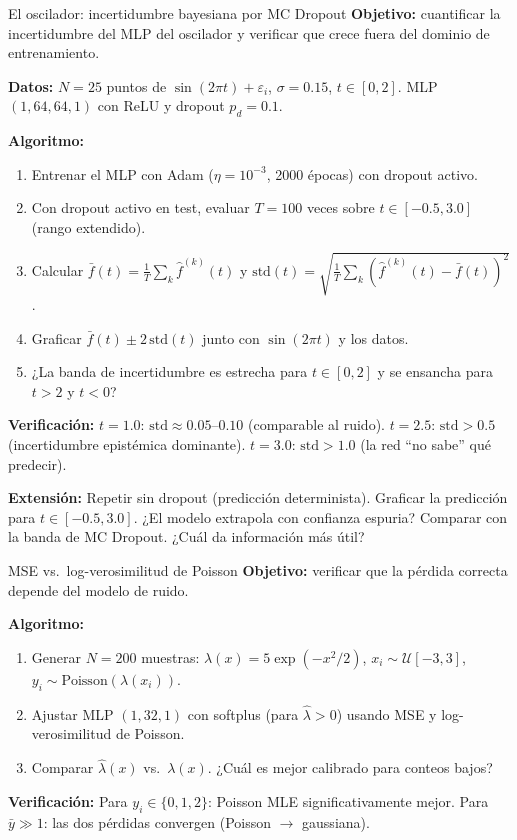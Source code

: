 \begin{ejerciciocomp}{El oscilador: incertidumbre bayesiana por MC Dropout}
\label{ejcomp:oscilador7}
\textbf{Objetivo:} cuantificar la incertidumbre del MLP del oscilador y
verificar que crece fuera del dominio de entrenamiento.

\medskip\noindent\textbf{Datos:}
$N = 25$ puntos de $\sin(2\pi t)+\varepsilon_i$, $\sigma = 0.15$,
$t \in [0, 2]$. MLP $(1, 64, 64, 1)$ con ReLU y dropout $p_d = 0.1$.

\medskip\noindent\textbf{Algoritmo:}
\begin{enumerate}
  \item Entrenar el MLP con Adam ($\eta = 10^{-3}$, 2000 épocas) con
        dropout activo.
  \item Con dropout activo en test, evaluar $T = 100$ veces sobre
        $t \in [-0.5, 3.0]$ (rango extendido).
  \item Calcular $\bar{f}(t) = \frac{1}{T}\sum_k\hat{f}^{(k)}(t)$ y
        $\text{std}(t) = \sqrt{\frac{1}{T}\sum_k
        (\hat{f}^{(k)}(t)-\bar{f}(t))^2}$.
  \item Graficar $\bar{f}(t) \pm 2\,\text{std}(t)$ junto con
        $\sin(2\pi t)$ y los datos.
  \item ¿La banda de incertidumbre es estrecha para $t \in [0,2]$ y se
        ensancha para $t > 2$ y $t < 0$?
\end{enumerate}

\medskip\noindent\textbf{Verificación:}
$t = 1.0$: $\text{std} \approx 0.05$--$0.10$ (comparable al ruido).
$t = 2.5$: $\text{std} > 0.5$ (incertidumbre epistémica dominante).
$t = 3.0$: $\text{std} > 1.0$ (la red ``no sabe'' qué predecir).

\medskip\noindent\textbf{Extensión:}
Repetir sin dropout (predicción determinista). Graficar la predicción para
$t \in [-0.5, 3.0]$. ¿El modelo extrapola con confianza espuria?
Comparar con la banda de MC Dropout. ¿Cuál da información más útil?
\end{ejerciciocomp}

\begin{ejerciciocomp}{MSE vs.\ log-verosimilitud de Poisson}
\label{ejcomp:poisson}
\textbf{Objetivo:} verificar que la pérdida correcta depende del modelo
de ruido.

\medskip\noindent\textbf{Algoritmo:}
\begin{enumerate}
  \item Generar $N = 200$ muestras:
        $\lambda(x) = 5\exp(-x^2/2)$, $x_i \sim \mathcal{U}[-3,3]$,
        $y_i \sim \text{Poisson}(\lambda(x_i))$.
  \item Ajustar MLP $(1, 32, 1)$ con softplus (para $\hat{\lambda} > 0$)
        usando MSE y log-verosimilitud de Poisson.
  \item Comparar $\hat{\lambda}(x)$ vs.\ $\lambda(x)$. ¿Cuál es mejor
        calibrado para conteos bajos?
\end{enumerate}

\medskip\noindent\textbf{Verificación:}
Para $y_i \in \{0,1,2\}$: Poisson MLE significativamente mejor.
Para $\bar{y} \gg 1$: las dos pérdidas convergen (Poisson $\to$
gaussiana).
\end{ejerciciocomp}

